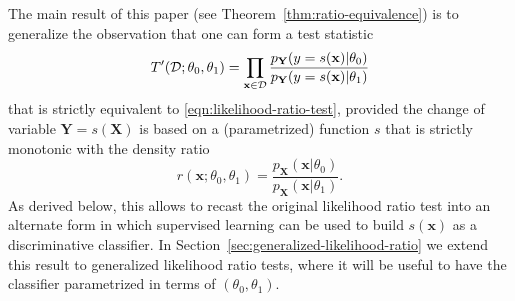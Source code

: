 \documentclass[12pt]{article}
\numberwithin{equation}{section}
\theoremstyle{plain}
\begin{document}
%

The main result of this paper (see Theorem~\ref{thm:ratio-equivalence}) is to
generalize the observation that one can form a test statistic
\begin{equation}\label{eqn:likelihood-ratio-test-equiv}
T'({\cal D}; \theta_0, \theta_1) = \prod_{\mathbf{x} \in {\cal D}} \frac{ p_\mathbf{Y}(y=s(\mathbf{x}) | \theta_0)}{ p_\mathbf{Y}(y=s(\mathbf{x}) | \theta_1)}
\end{equation}
that is strictly equivalent to \ref{eqn:likelihood-ratio-test}, provided the change
of variable $\mathbf{Y} = s(\mathbf{X})$ is based
on a (parametrized) function $s$ that is strictly monotonic with the density ratio
\begin{equation}
r(\mathbf{x};\theta_0, \theta_1) = \frac{p_\mathbf{X}(\mathbf{x}|\theta_0)}{p_\mathbf{X}(\mathbf{x}|\theta_1)}.
\end{equation}
As derived below, this allows to recast the original likelihood ratio test into
an alternate form in which supervised learning can be used to build
$s(\mathbf{x})$ as a discriminative classifier.  In
Section~\ref{sec:generalized-likelihood-ratio} we extend this result to
generalized likelihood ratio tests, where it will be useful to have the
classifier  parametrized in terms of $(\theta_0, \theta_1)$.
\end{document}
